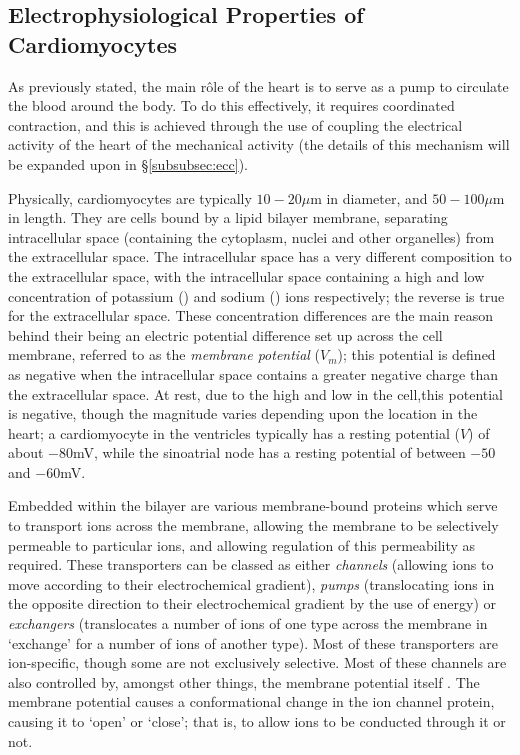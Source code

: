 \documentclass[../thesis-main.tex]{subfiles}
\begin{document}
 \subsection{Electrophysiological Properties of Cardiomyocytes}
 \label{subsec:electro-prop}
 As previously stated, the main r\^ole of the heart is to serve as a pump to circulate the blood around the body. To do this effectively, it requires coordinated contraction, and this is achieved through the use of coupling the electrical activity of the heart of the mechanical activity (the details of this mechanism will be expanded upon in \S\ref{subsubsec:ecc}).
 
 Physically, cardiomyocytes are typically $10-20\mu$m in diameter, and $50-100\mu$m in length. They are cells bound by a lipid bilayer membrane, separating intracellular space (containing the cytoplasm, nuclei and other organelles) from the extracellular space. The intracellular space has a very different composition to the extracellular space, with the intracellular space containing a high and low concentration of potassium (\K) and sodium (\na) ions respectively; the reverse is true for the extracellular space. These concentration differences are the main reason behind their being an electric potential difference set up across the cell membrane, referred to as the \emph{membrane potential} ($V_m$); this potential is defined as negative when the intracellular space contains a greater negative charge than the extracellular space. At rest, due to the high \K{} and low \na{} in the cell,this potential is negative, though the magnitude varies depending upon the location in the heart; a cardiomyocyte in the ventricles typically has a resting potential ($V$) of about $-80$mV, while the sinoatrial node has a resting potential of between $-50$ and $-60$mV.
 
 Embedded within the bilayer are various membrane-bound proteins which serve to transport ions across the membrane, allowing the membrane to be selectively permeable to particular ions, and allowing regulation of this permeability as required. These transporters can be classed as either \emph{channels} (allowing ions to move according to their electrochemical gradient), \emph{pumps} (translocating ions in the opposite direction to their electrochemical gradient by the use of energy) or \emph{exchangers} (translocates a number of ions of one type across the membrane in `exchange' for a number of ions of another type). Most of these transporters are ion-specific, though some are not exclusively selective. Most of these channels are also controlled by, amongst other things, the membrane potential itself \citep{Bezanilla2000}. The membrane potential causes a conformational change in the ion channel protein, causing it to `open' or `close'; that is, to allow ions to be conducted through it or not.
 
\end{document}
